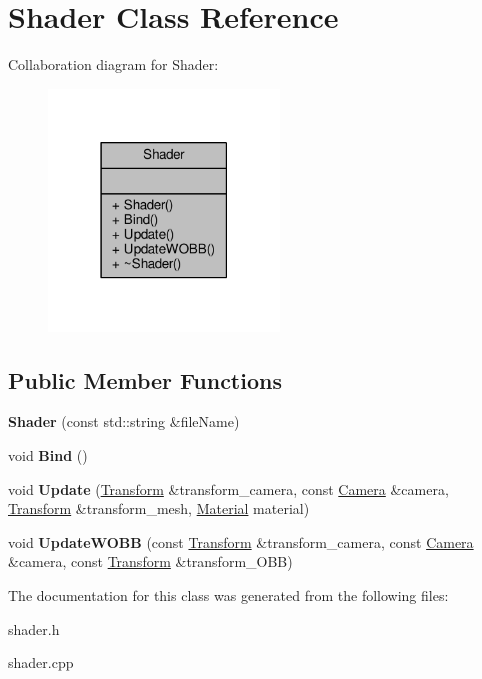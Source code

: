 \hypertarget{class_shader}{}\section{Shader Class Reference}
\label{class_shader}


Collaboration diagram for Shader\+:\nopagebreak
\begin{figure}[H]
\begin{center}
\leavevmode
\includegraphics[width=174pt]{class_shader__coll__graph}
\end{center}
\end{figure}
\subsection*{Public Member Functions}
\begin{DoxyCompactItemize}
\item 
{\bfseries Shader} (const std\+::string \&file\+Name)\hypertarget{class_shader_a2c4961936691818dee95a5ef7c40155a}{}\label{class_shader_a2c4961936691818dee95a5ef7c40155a}

\item 
void {\bfseries Bind} ()\hypertarget{class_shader_a8b5c8c4788d011a65d158ef8428d1ece}{}\label{class_shader_a8b5c8c4788d011a65d158ef8428d1ece}

\item 
void {\bfseries Update} (\hyperlink{class_transform}{Transform} \&transform\+\_\+camera, const \hyperlink{class_camera}{Camera} \&camera, \hyperlink{class_transform}{Transform} \&transform\+\_\+mesh, \hyperlink{struct_material}{Material} material)\hypertarget{class_shader_ab1726c73d854211d8011afcfb157d5b7}{}\label{class_shader_ab1726c73d854211d8011afcfb157d5b7}

\item 
void {\bfseries Update\+W\+O\+BB} (const \hyperlink{class_transform}{Transform} \&transform\+\_\+camera, const \hyperlink{class_camera}{Camera} \&camera, const \hyperlink{class_transform}{Transform} \&transform\+\_\+\+O\+BB)\hypertarget{class_shader_af2504477df3226b64e65b0240ce45fd0}{}\label{class_shader_af2504477df3226b64e65b0240ce45fd0}

\end{DoxyCompactItemize}


The documentation for this class was generated from the following files\+:\begin{DoxyCompactItemize}
\item 
shader.\+h\item 
shader.\+cpp\end{DoxyCompactItemize}
